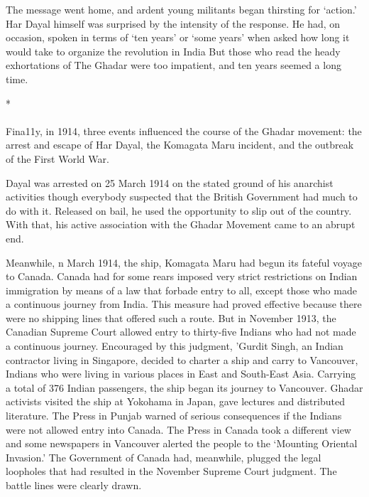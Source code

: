 The message went home, and ardent young militants began thirsting for `action.' Har Dayal himself was surprised by the intensity of the response. He had, on occasion, spoken in terms of `ten years' or `some years' when asked how long it would take to organize the revolution in India But those who read the heady exhortations of The Ghadar were too impatient, and ten years seemed a long time.

\begin{center}*\end{center}

\paragraph*{}


Fina11y, in 1914, three events influenced the course of the Ghadar movement: the arrest and escape of Har Dayal, the Komagata Maru incident, and the outbreak of the First World War.

Dayal was arrested on 25 March 1914 on the stated ground of his anarchist activities though everybody suspected that the British Government had much to do with it. Released on bail, he used the opportunity to slip out of the country. With that, his active association with the Ghadar Movement came to an abrupt end.

Meanwhile, n March 1914, the ship, Komagata Maru had begun its fateful voyage to Canada. Canada had for some rears imposed very strict restrictions on Indian immigration by means of a law that forbade entry to all, except those who made a continuous journey from India. This measure had proved effective because there were no shipping lines that offered such a route. But in November 1913, the Canadian Supreme Court allowed entry to thirty-five Indians who had not made a continuous journey. Encouraged by this judgment, 'Gurdit Singh, an Indian contractor living in Singapore, decided to charter a ship and carry to Vancouver, Indians who were living in various places in East and South-East Asia. Carrying a total of 376 Indian passengers, the ship began its journey to Vancouver. Ghadar activists visited the ship at Yokohama in Japan, gave lectures and distributed literature. The Press in Punjab warned of serious consequences if the Indians were not allowed entry into Canada. The Press in Canada took a different view and some newspapers in Vancouver alerted the people to the `Mounting Oriental Invasion.' The Government of Canada had, meanwhile, plugged the legal loopholes that had resulted in the November Supreme Court judgment. The battle lines were clearly drawn.

